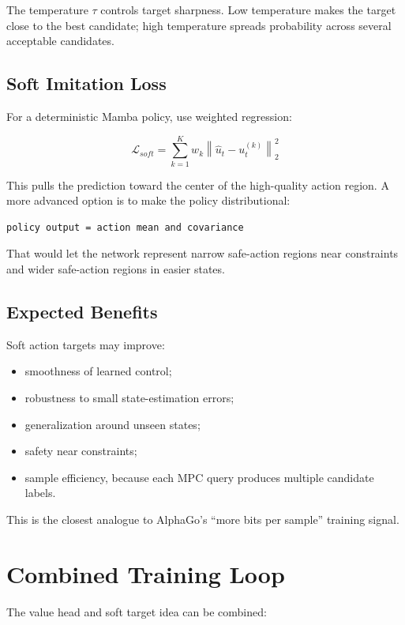\documentclass[11pt]{article}
\begin{document}
The temperature \(\tau\) controls target sharpness. Low temperature makes the target close to the best candidate; high temperature spreads probability across several acceptable candidates.

\subsection{Soft Imitation Loss}

For a deterministic Mamba policy, use weighted regression:

\[
\mathcal{L}_{soft}
=
\sum_{k=1}^{K}
w_k
\left\|
\hat{u}_t - u_t^{(k)}
\right\|_2^2
\]

This pulls the prediction toward the center of the high-quality action region. A more advanced option is to make the policy distributional:

\begin{lstlisting}
policy output = action mean and covariance
\end{lstlisting}

That would let the network represent narrow safe-action regions near constraints and wider safe-action regions in easier states.

\subsection{Expected Benefits}

Soft action targets may improve:

\begin{itemize}
  \item smoothness of learned control;
  \item robustness to small state-estimation errors;
  \item generalization around unseen states;
  \item safety near constraints;
  \item sample efficiency, because each MPC query produces multiple candidate labels.
\end{itemize}

This is the closest analogue to AlphaGo's ``more bits per sample'' training signal.

\section{Combined Training Loop}

The value head and soft target idea can be combined:
\end{document}
